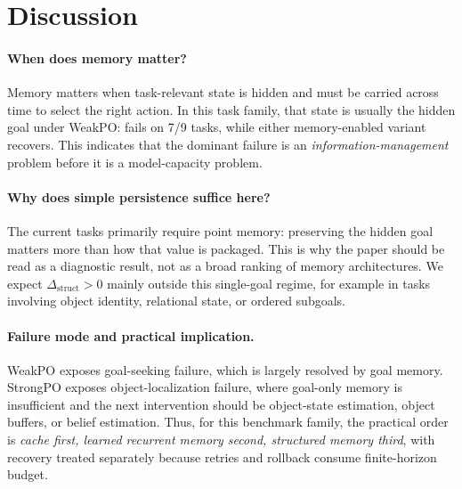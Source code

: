 \section{Discussion}
\label{sec:discussion}

\paragraph{When does memory matter?}
Memory matters when task-relevant state is hidden and must be carried across time to select the right action. In this task family, that state is usually the hidden goal under WeakPO:  fails on 7/9 tasks, while either memory-enabled variant recovers. This indicates that the dominant failure is an \emph{information-management} problem before it is a model-capacity problem.

\paragraph{Why does simple persistence suffice here?}
The current tasks primarily require point memory: preserving the hidden goal matters more than how that value is packaged. This is why the paper should be read as a diagnostic result, not as a broad ranking of memory architectures. We expect $\Delta_{\text{struct}}>0$ mainly outside this single-goal regime, for example in tasks involving object identity, relational state, or ordered subgoals.

\paragraph{Failure mode and practical implication.}
WeakPO exposes goal-seeking failure, which is largely resolved by goal memory. StrongPO exposes object-localization failure, where goal-only memory is insufficient and the next intervention should be object-state estimation, object buffers, or belief estimation. Thus, for this benchmark family, the practical order is \emph{cache first, learned recurrent memory second, structured memory third}, with recovery treated separately because retries and rollback consume finite-horizon budget.
